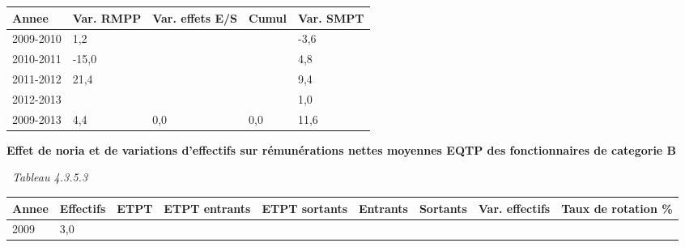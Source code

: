 \begin{longtable}[]{@{}lllll@{}}
\toprule
Annee & Var. RMPP & Var. effets E/S & Cumul & Var. SMPT\tabularnewline
\midrule
\endhead
2009-2010 & 1,2 & & & -3,6\tabularnewline
2010-2011 & -15,0 & & & 4,8\tabularnewline
2011-2012 & 21,4 & & & 9,4\tabularnewline
2012-2013 & & & & 1,0\tabularnewline
2009-2013 & 4,4 & 0,0 & 0,0 & 11,6\tabularnewline
\bottomrule
\end{longtable}

\textbf{Effet de noria et de variations d'effectifs sur rémunérations
nettes moyennes EQTP des fonctionnaires de categorie B}

~\emph{Tableau 4.3.5.3}

\begin{longtable}[]{@{}lllllllll@{}}
\toprule
\begin{minipage}[b]{0.05\columnwidth}\raggedright
Annee\strut
\end{minipage} & \begin{minipage}[b]{0.08\columnwidth}\raggedright
Effectifs\strut
\end{minipage} & \begin{minipage}[b]{0.04\columnwidth}\raggedright
ETPT\strut
\end{minipage} & \begin{minipage}[b]{0.10\columnwidth}\raggedright
ETPT entrants\strut
\end{minipage} & \begin{minipage}[b]{0.10\columnwidth}\raggedright
ETPT sortants\strut
\end{minipage} & \begin{minipage}[b]{0.07\columnwidth}\raggedright
Entrants\strut
\end{minipage} & \begin{minipage}[b]{0.07\columnwidth}\raggedright
Sortants\strut
\end{minipage} & \begin{minipage}[b]{0.11\columnwidth}\raggedright
Var. effectifs\strut
\end{minipage} & \begin{minipage}[b]{0.14\columnwidth}\raggedright
Taux de rotation \%\strut
\end{minipage}\tabularnewline
\midrule
\endhead
\begin{minipage}[t]{0.05\columnwidth}\raggedright
2009\strut
\end{minipage} & \begin{minipage}[t]{0.08\columnwidth}\raggedright
3,0\strut
\end{minipage} & \begin{minipage}[t]{0.04\columnwidth}\raggedright

\end{minipage}
\end{longtable}
